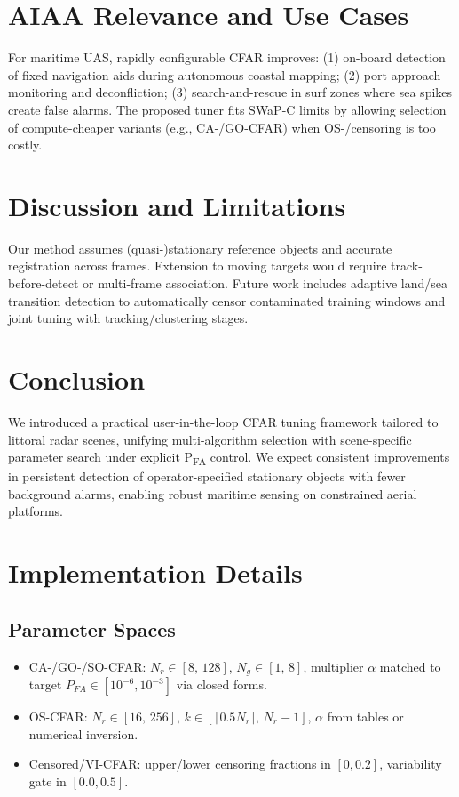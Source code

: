 \documentclass[conf]{new-aiaa}
\begin{document}
\section{AIAA Relevance and Use Cases}
For maritime UAS, rapidly configurable CFAR improves: (1) on-board detection of fixed navigation aids during autonomous coastal mapping; (2) port approach monitoring and deconfliction; (3) search-and-rescue in surf zones where sea spikes create false alarms. The proposed tuner fits SWaP-C limits by allowing selection of compute-cheaper variants (e.g., CA-/GO-CFAR) when OS-/censoring is too costly.

\section{Discussion and Limitations}
Our method assumes (quasi-)stationary reference objects and accurate registration across frames. Extension to moving targets would require track-before-detect or multi-frame association. Future work includes adaptive land/sea transition detection to automatically censor contaminated training windows and joint tuning with tracking/clustering stages.

\section{Conclusion}
We introduced a practical user-in-the-loop CFAR tuning framework tailored to littoral radar scenes, unifying multi-algorithm selection with scene-specific parameter search under explicit P\textsubscript{FA} control. We expect consistent improvements in persistent detection of operator-specified stationary objects with fewer background alarms, enabling robust maritime sensing on constrained aerial platforms.

\appendix
\section{Implementation Details}
\subsection{Parameter Spaces}
\begin{itemize}
  \item CA-/GO-/SO-CFAR: $N_r\in[8,\,128]$, $N_g\in[1,\,8]$, multiplier $\alpha$ matched to target $P_{FA} \in [10^{-6},10^{-3}]$ via closed forms.
  \item OS-CFAR: $N_r\in[16,\,256]$, $k\in[\lceil0.5N_r\rceil,\,N_r-1]$, $\alpha$ from tables or numerical inversion.
  \item Censored/VI-CFAR: upper/lower censoring fractions in $[0,0.2]$, variability gate in $[0.0,0.5]$.
\end{itemize}
\end{document}
